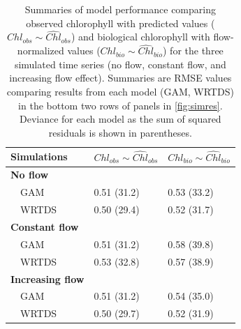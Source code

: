 \documentclass[letterpaper,12pt,oneside]{article}\usepackage[]{graphicx}\usepackage[]{color}
\begin{document}
\begin{table}[!tbp]
\caption{Summaries of model performance comparing observed chlorophyll with predicted values ($Chl_{obs} \sim \widehat{Chl}_{obs}$) and biological chlorophyll with flow-normalized values ($Chl_{bio} \sim \widehat{Chl}_{bio}$) for the three simulated time series (no flow, constant flow, and increasing flow effect).  Summaries are \ac{RMSE} values comparing results from each model (\ac{GAM}, \ac{WRTDS}) in the bottom two rows of panels in \cref{fig:simres}. Deviance for each model as the sum of squared residuals is shown in parentheses.\label{tab:simperf}} 
\begin{center}
\begin{tabular}{lll}
\hline\hline
\multicolumn{1}{l}{Simulations}&\multicolumn{1}{c}{$Chl_{obs} \sim \widehat{Chl}_{obs}$}&\multicolumn{1}{c}{$Chl_{bio} \sim \widehat{Chl}_{bio}$}\tabularnewline
\hline
{\bfseries No flow}&&\tabularnewline
~~GAM&0.51 (31.2)&0.53 (33.2)\tabularnewline
~~WRTDS&0.50 (29.4)&0.52 (31.7)\tabularnewline
\hline
{\bfseries Constant flow}&&\tabularnewline
~~GAM&0.51 (31.2)&0.58 (39.8)\tabularnewline
~~WRTDS&0.53 (32.8)&0.57 (38.9)\tabularnewline
\hline
{\bfseries Increasing flow}&&\tabularnewline
~~GAM&0.51 (31.2)&0.54 (35.0)\tabularnewline
~~WRTDS&0.50 (29.7)&0.52 (31.9)\tabularnewline
\hline
\end{tabular}\end{center}

\end{table}


\end{document}
